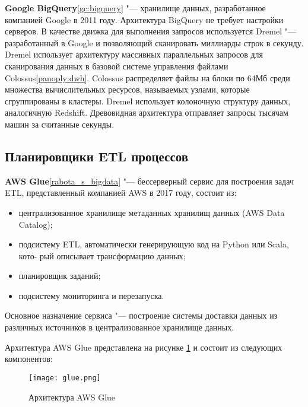 \documentclass[bachelor, och, pract]{SCWorks}
\begin{document}
\textbf{Google BigQuery}\ref{gc:bigquery} "--- хранилище данных, разработанное компанией Google в 2011 году. Архитектура BigQuery не требует настройки серверов. В качестве движка для выполнения запросов используется Dremel "--- разработанный в Google  и позволяющий сканировать миллиарды строк в секунду. Dremel использует архитектуру массивных параллельных запросов для сканирования данных в базовой системе управления файлами Colossus\ref{panoply:dwh}. Colossus распределяет файлы на блоки по 64Мб среди множества вычислительных ресурсов, называемых узлами, которые сгруппированы в кластеры. Dremel использует колоночную структуру данных, аналогичную Redshift. Древовидная архитектура отправляет запросы тысячам машин за считанные секунды.

\subsection{Планировщики ETL процессов}

\textbf{AWS Glue}\ref{rabota_s_bigdata} "--- бессерверный сервис для построения задач ETL, представленный компанией AWS в 2017 году, состоит из:

\begin{itemize}
	\item централизованное хранилище метаданных хранилищ данных (AWS Data Catalog);
	\item подсистему ETL, автоматически генерирующую код на Python или Scala, кото-
	рый описывает трансформацию данных;
	\item планировщик заданий;
	\item подсистему мониторинга и перезапуска.
\end{itemize}

Основное назначение сервиса "--- построение системы доставки данных из различных источников в централизованное хранилище данных. 

Архитектура AWS Glue представлена на рисунке \ref{glue} и состоит из следующих компонентов:

\begin{figure}[!ht]
	\centering
	\texttt{[image: glue.png]}
	\caption{\label{glue}
		Архитектура AWS Glue}
\end{figure}
\end{document}

